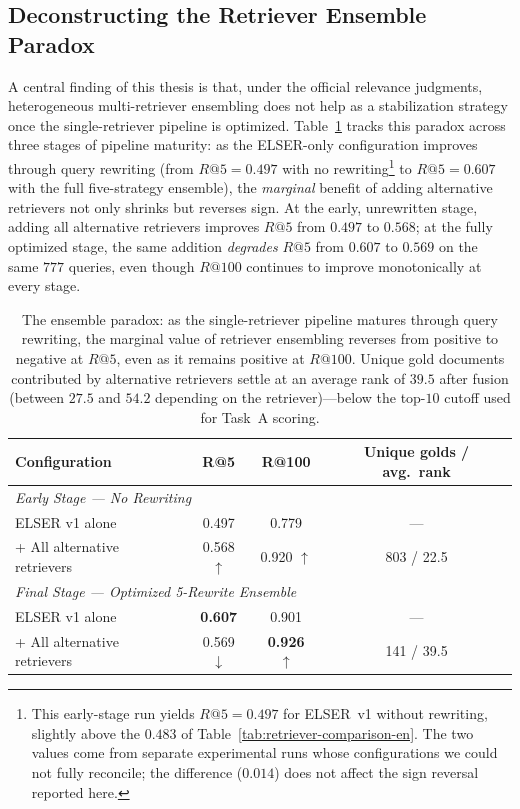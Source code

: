 \subsection{Deconstructing the Retriever Ensemble Paradox}
\label{sec:ensemble-paradox}

A central finding of this thesis is that, under the official relevance judgments, heterogeneous multi-retriever ensembling does not help as a stabilization strategy once the single-retriever pipeline is optimized. Table~\ref{tab:ensemble-paradox-en} tracks this paradox across three stages of pipeline maturity: as the ELSER-only configuration improves through query rewriting (from $R@5{=}0.497$ with no rewriting\footnote{This early-stage run yields $R@5{=}0.497$ for ELSER~v1 without rewriting, slightly above the $0.483$ of Table~\ref{tab:retriever-comparison-en}. The two values come from separate experimental runs whose configurations we could not fully reconcile; the difference ($0.014$) does not affect the sign reversal reported here.} to $R@5{=}0.607$ with the full five-strategy ensemble), the \emph{marginal} benefit of adding alternative retrievers not only shrinks but reverses sign. At the early, unrewritten stage, adding all alternative retrievers improves $R@5$ from $0.497$ to $0.568$; at the fully optimized stage, the same addition \emph{degrades} $R@5$ from $0.607$ to $0.569$ on the same $777$ queries, even though $R@100$ continues to improve monotonically at every stage.

\begin{table}[h]
\centering
\small
\begin{tabular}{lccc}
\toprule
\textbf{Configuration} & \textbf{R@5} & \textbf{R@100} & \textbf{Unique golds / avg.\ rank} \\
\midrule
\multicolumn{4}{l}{\textit{Early Stage --- No Rewriting}} \\
ELSER v1 alone & 0.497 & 0.779 & --- \\
+ All alternative retrievers & 0.568 $\uparrow$ & 0.920 $\uparrow$ & 803 / 22.5 \\
\midrule
\multicolumn{4}{l}{\textit{Final Stage --- Optimized 5-Rewrite Ensemble}} \\
ELSER v1 alone & \textbf{0.607} & 0.901 & --- \\
+ All alternative retrievers & 0.569 $\downarrow$ & \textbf{0.926} $\uparrow$ & 141 / 39.5 \\
\bottomrule
\end{tabular}
\caption{The ensemble paradox: as the single-retriever pipeline matures through query rewriting, the marginal value of retriever ensembling reverses from positive to negative at $R@5$, even as it remains positive at $R@100$. Unique gold documents contributed by alternative retrievers settle at an average rank of $39.5$ after fusion (between $27.5$ and $54.2$ depending on the retriever)---below the top-$10$ cutoff used for Task~A scoring.}
\label{tab:ensemble-paradox-en}
\end{table}

